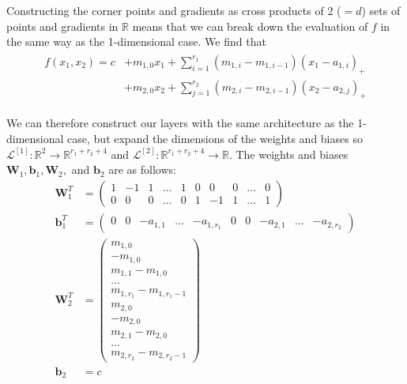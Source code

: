 \documentclass{somasmsc}
\begin{document}
Constructing the corner points and gradients as cross products of 2 ($=d$) sets of points and gradients in $\mathbb{R}$ means that we can break down the evaluation of $f$ in the same way as the 1-dimensional case. We find that
\begin{align}\label{piece:eq2}
\begin{split}
f\left(x_1, x_2\right) = c &+ m_{1,0} x_1 + \sum_{i=1}^{r_1} \left(m_{1,i} - m_{1,i-1}\right) \left(x_1 - a_{1,i}\right)_+ \\
&+ m_{2,0} x_2 + \sum_{j=1}^{r_2} \left(m_{2,i} - m_{2,i-1}\right) \left(x_2 - a_{2,j}\right)_+
\end{split}
\end{align}

We can therefore construct our layers with the same architecture as the 1-dimensional case, but expand the dimensions of the weights and biases so $\mathcal{L}^{\left[1\right]}: \mathbb{R}^2 \rightarrow \mathbb{R}^{r_1 + r_2 + 4}$ and $\mathcal{L}^{\left[2\right]}: \mathbb{R}^{r_1 + r_2 + 4} \rightarrow \mathbb{R}$. The weights and biases $\mathbf{W}_1, \pmb{b}_1, \mathbf{W}_2,$ and $\pmb{b}_2$ are as follows:
\begin{align*}
\mathbf{W}_1^T &=
\begin{pmatrix}
    1 & -1 & 1 & \dots & 1 & 0 & 0 & 0 & \dots & 0 \\
    0 & 0 & 0 & \dots & 0 & 1 & -1 & 1 & \dots & 1
\end{pmatrix} \\
\pmb{b}_1^T &= 
\begin{pmatrix}
    0 & 0 & -a_{1,1} & \dots & -a_{1,r_1} & 0 & 0 & -a_{2,1} & \dots & -a_{2,r_2}
\end{pmatrix} \\
\mathbf{W}_2^T &= 
\begin{pmatrix}
    m_{1,0} \\
    -m_{1,0} \\
    m_{1,1} - m_{1,0} \\
    \dots \\
    m_{1,r_1} - m_{1,r_1 - 1} \\
    m_{2,0} \\
    -m_{2,0} \\
    m_{2,1} - m_{2,0} \\
    \dots \\
    m_{2,r_2} - m_{2,r_2 - 1}
\end{pmatrix} \\
\pmb{b}_2 &= c
\end{align*}
\end{document}
